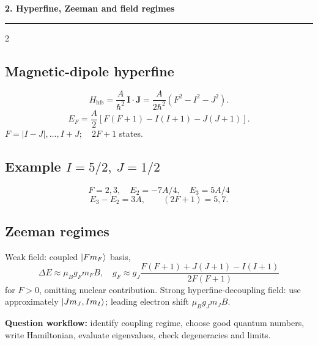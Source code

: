 
{\Large\bfseries\color{accent}2. Hyperfine, Zeeman and field regimes}
\hrule\smallskip
\begin{multicols}{2}
\subsection*{Magnetic-dipole hyperfine}
\[
H_\mathrm{hfs}=\frac A{\hbar^2}\,\mathbf I\cdot\mathbf J
=\frac A{2\hbar^2}(F^2-I^2-J^2).
\]
\[
\boxed{E_F=\frac A2[F(F+1)-I(I+1)-J(J+1)].}
\]
\(F=|I-J|,\ldots,I+J;\quad 2F+1\) states.
\subsection*{Example \(I=5/2,\ J=1/2\)}
\[
F=2,3,\quad E_2=-7A/4,\quad E_3=5A/4
\]
\[
E_3-E_2=3A,\qquad (2F+1)=5,7.
\]
\subsection*{Zeeman regimes}
Weak field: coupled \(\left\lvert Fm_F\right\rangle\) basis,
\[
\Delta E \approx \mu_B g_Fm_FB,
\quad
g_F \approx g_J\frac{F(F+1)+J(J+1)-I(I+1)}
{2F(F+1)}
\]
for \(F>0\), omitting nuclear contribution.
Strong hyperfine-decoupling field:
use approximately \(\left\lvert Jm_J,Im_I\right\rangle\); leading
electron shift \(\mu_B g_J m_JB\).
\begin{methodbox}
\textbf{Question workflow:} identify coupling regime,
choose good quantum numbers, write Hamiltonian, evaluate
eigenvalues, check degeneracies and limits.
\end{methodbox}
\end{multicols}
